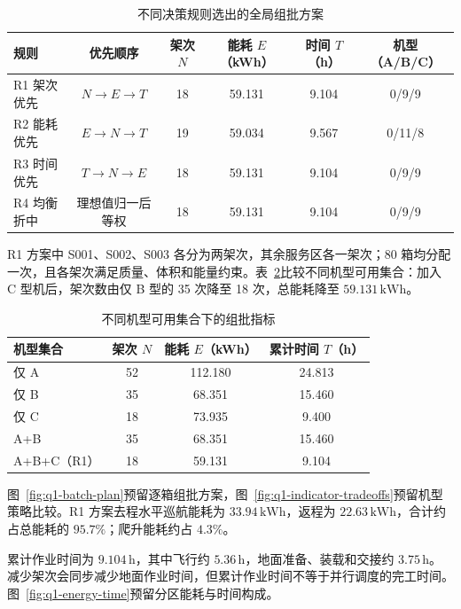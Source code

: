 \documentclass[bwprint,fontset=windows]{gmcmthesis}
\begin{document}
\begin{table}[!htbp]
\centering
\caption{不同决策规则选出的全局组批方案}
\label{tab:q1-rules}
\small
\begin{tabular}{@{}lccccc@{}}
\toprule
规则 & 优先顺序 & 架次 $N$ & 能耗 $E$（kWh） & 时间 $T$（h） & 机型（A/B/C） \\
\midrule
R1 架次优先 & $N\to E\to T$ & 18 & 59.131 & 9.104 & 0/9/9 \\
R2 能耗优先 & $E\to N\to T$ & 19 & 59.034 & 9.567 & 0/11/8 \\
R3 时间优先 & $T\to N\to E$ & 18 & 59.131 & 9.104 & 0/9/9 \\
R4 均衡折中 & 理想值归一后等权 & 18 & 59.131 & 9.104 & 0/9/9 \\
\bottomrule
\end{tabular}
\end{table}

R1 方案中 S001、S002、S003 各分为两架次，其余服务区各一架次；80 箱均分配一次，且各架次满足质量、体积和能量约束。表~\ref{tab:q1-fleet-policy}比较不同机型可用集合：加入 C 型机后，架次数由仅 B 型的 35 次降至 18 次，总能耗降至 $59.131\,\mathrm{kWh}$。

\begin{table}[!htbp]
\centering
\caption{不同机型可用集合下的组批指标}
\label{tab:q1-fleet-policy}
\small
\begin{tabular*}{0.90\textwidth}{@{\extracolsep{\fill}}lccc@{}}
\toprule
机型集合 & 架次 $N$ & 能耗 $E$（kWh） & 累计时间 $T$（h） \\
\midrule
仅 A & 52 & 112.180 & 24.813 \\
仅 B & 35 & 68.351 & 15.460 \\
仅 C & 18 & 73.935 & 9.400 \\
A+B & 35 & 68.351 & 15.460 \\
A+B+C（R1） & 18 & 59.131 & 9.104 \\
\bottomrule
\end{tabular*}
\end{table}

图~\ref{fig:q1-batch-plan}预留逐箱组批方案，图~\ref{fig:q1-indicator-tradeoffs}预留机型策略比较。R1 方案去程水平巡航能耗为 $33.94\,\mathrm{kWh}$，返程为 $22.63\,\mathrm{kWh}$，合计约占总能耗的 $95.7\%$；爬升能耗约占 $4.3\%$。

累计作业时间为 $9.104\,\mathrm{h}$，其中飞行约 $5.36\,\mathrm{h}$，地面准备、装载和交接约 $3.75\,\mathrm{h}$。减少架次会同步减少地面作业时间，但累计作业时间不等于并行调度的完工时间。图~\ref{fig:q1-energy-time}预留分区能耗与时间构成。
\end{document}
